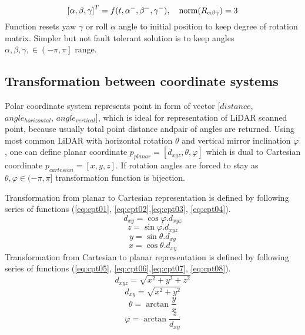 \begin{equation}
    \left [ \alpha, \beta ,\gamma \right ]^T = f(t,\alpha^-,\beta^-,\gamma^-), \quad \textnormal{norm}(R_{\alpha\beta\gamma})=3
\end{equation}
Function resets yaw $\gamma$ or roll $\alpha$ angle to initial position to keep degree of rotation matrix. Simpler but not fault tolerant solution is to keep angles $\alpha,\beta,\gamma, \in \left (  -\pi,\pi\right ]$ range.

\subsection{Transformation between coordinate systems}
\noindent Polar coordinate system represents point in form of vector $[distance$, $angle_{horizontal}$, $angle_{vertical}]$, which is ideal for representation of LiDAR scanned point, because usually total point distance andpair of angles are returned. Using most common LiDAR with horizontal rotation $\theta$ and vertical mirror inclination $\varphi$, one can define planar coordinate $p_{planar} = [d_{xyz},\theta,\varphi]$ which is dual to Cartesian coordinate $p_{cartesian} = [x,y,z]$. If rotation angles are forced to stay as $\theta,\varphi\in(-\pi,\pi]$ transformation function is bijection.

Transformation from planar to Cartesian representation is defined by following series of functions (\ref{eq:cpt01}, \ref{eq:cpt02},\ref{eq:cpt03}, \ref{eq:cpt04}).
\begin{equation}\label{eq:cpt01}
    d_{xy} = \cos\varphi.d_{xyz}
\end{equation}
\begin{equation}\label{eq:cpt02}
    z = \sin\varphi.d_{xyz}
\end{equation}
\begin{equation}\label{eq:cpt03}
    y = \sin\theta.d_{xy}
\end{equation}
\begin{equation}\label{eq:cpt04}
    x = \cos\theta.d_{xy}
\end{equation}
Transformation from Cartesian to planar representation is defined by following series of functions (\ref{eq:cpt05}, \ref{eq:cpt06},\ref{eq:cpt07}, \ref{eq:cpt08}).
\begin{equation}\label{eq:cpt05}
    d_{xyz} = \sqrt{x^2+y^2+z^2}    
\end{equation}
\begin{equation}\label{eq:cpt06}
    d_{xy} = \sqrt{x^2+y^2}    
\end{equation}
\begin{equation}\label{eq:cpt07}
    \theta = \arctan\frac{y}{x}
\end{equation}
\begin{equation}\label{eq:cpt08}
    \varphi= \arctan\frac{z}{d_{xy}}
\end{equation}

